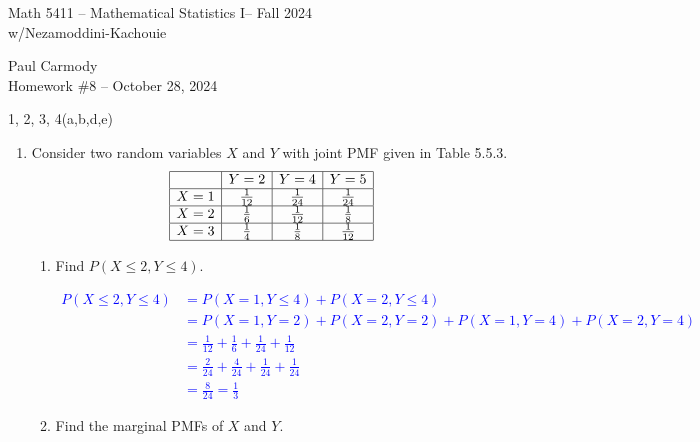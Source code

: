 \documentclass[10pt,a4paper]{report}
\newcommand{\CLASSNAME}{Math 5411 -- Mathematical Statistics I}
\newcommand{\PROFESSOR}{Nezamoddini-Kachouie}
\newcommand{\STUDENTNAME}{Paul Carmody}
\newcommand{\ASSIGNMENT}{Homework \#8 }
\newcommand{\DUEDATE}{October 28, 2024}
\newcommand{\SEMESTER}{Fall 2024}
\newcommand{\BLUE}[1]{\textcolor{blue}{#1}}
\begin{document}
\begin{center}
	\Large{\CLASSNAME -- \SEMESTER} \\
	\large{w/\PROFESSOR}
\end{center}
\begin{center}
	\STUDENTNAME \\
	\ASSIGNMENT -- \DUEDATE\\
\end{center}

1, 2, 3, 4(a,b,d,e)
\begin{enumerate}
	\item Consider two random variables $X$ and $Y$ with joint PMF given in Table 5.5.3.
	\begin{align*}
		\begin{array}{|c|c|c|c|}
			\hline     & Y=2 & Y=4 & Y=5 \\
			\hline X=1 & \frac{1}{12} & \frac{1}{24} & \frac{1}{24} \\
			\hline X=2 & \frac{1}{6} & \frac{1}{12} & \frac{1}{8} \\
			\hline X=3 & \frac{1}{4} & \frac{1}{8} & \frac{1}{12} \\
			\hline
		\end{array}
	\end{align*}
	\begin{enumerate}
	\item Find $P(X \le 2, Y \le 4)$.
	
	\BLUE{\begin{align*}
		P(X \le 2, Y \le 4) &= P(X =1, Y \le 4) + P(X=2, Y \le 4)\\
		&= P(X =1, Y =2) + P(X=2, Y = 2) + P(X =1, Y = 4) + P(X=2, Y = 4) \\
		&= \frac{1}{12}+\frac{1}{6}+\frac{1}{24}+\frac{1}{12} \\
		&= \frac{2}{24}+\frac{4}{24}+\frac{1}{24}+\frac{1}{24} \\
		&= \frac{8}{24} = \frac{1}{3}
	\end{align*}
	} 
	
	\item Find the marginal PMFs of $X$ and $Y$.
	

\end{enumerate}
\end{enumerate}
\end{document}
